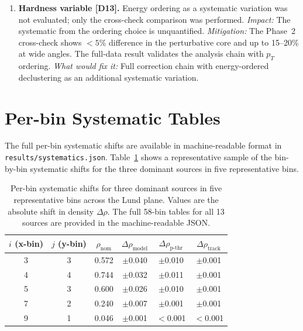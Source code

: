 \documentclass[11pt,a4paper]{article}
\begin{document}
\begin{enumerate}
\item \textbf{Hardness variable [D13].}  Energy ordering as a
  systematic variation was not evaluated; only the cross-check
  comparison was performed.  \emph{Impact:} The systematic from the
  ordering choice is unquantified.  \emph{Mitigation:} The Phase~2
  cross-check shows $<\!5\%$ difference in the perturbative core and
  up to 15--20\% at wide angles.  The full-data result validates the
  analysis chain with $p_T$ ordering.
  \emph{What would fix it:} Full correction chain with energy-ordered
  declustering as an additional systematic variation.
\end{enumerate}



\clearpage
\appendix

\section{Per-bin Systematic Tables}
\label{app:syst-tables}

The full per-bin systematic shifts are available in machine-readable
format in \texttt{results/systematics.json}.
Table~\ref{tbl:syst-perbin-sample} shows a representative sample of
the bin-by-bin systematic shifts for the three dominant sources in
five representative bins.

\begin{table}[htbp]
\centering
\caption{Per-bin systematic shifts for three dominant sources in five
  representative bins across the Lund plane.  Values are the absolute
  shift in density $\Delta\rho$.  The full 58-bin tables for all 13
  sources are provided in the machine-readable JSON.}
\label{tbl:syst-perbin-sample}
\begin{tabular}{cccccc}
\toprule
$i$ (x-bin) & $j$ (y-bin) & $\rho_\text{nom}$ &
  $\Delta\rho_\text{model}$ & $\Delta\rho_\text{p-thr}$ &
  $\Delta\rho_\text{track}$ \\
\midrule
3 & 3 & 0.572 & $\pm$0.040 & $\pm$0.010 & $\pm$0.001 \\
4 & 4 & 0.744 & $\pm$0.032 & $\pm$0.011 & $\pm$0.001 \\
5 & 3 & 0.600 & $\pm$0.026 & $\pm$0.010 & $\pm$0.001 \\
7 & 2 & 0.240 & $\pm$0.007 & $\pm$0.001 & $\pm$0.001 \\
9 & 1 & 0.046 & $\pm$0.001 & $<$0.001 & $<$0.001 \\
\bottomrule
\end{tabular}
\end{table}
\end{document}
